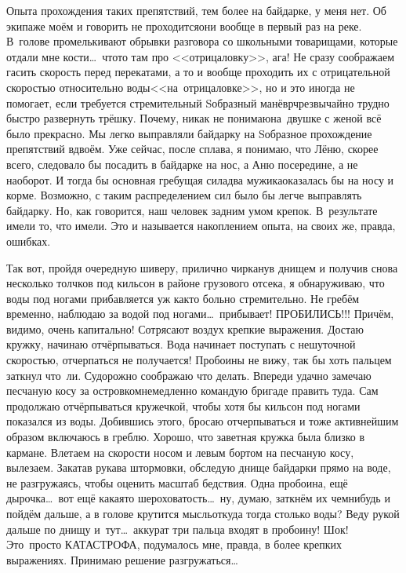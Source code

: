 Опыта прохождения таких препятствий, тем более на байдарке, у меня нет. Об экипаже моём и говорить не проходится\mdash они вообще в первый раз на реке. В~голове промелькивают обрывки разговора со школьными товарищами, которые отдали мне кости\ldots~что\sdash то там про <<отрицаловку>>, ага! Не сразу соображаем гасить скорость перед перекатами, а то и вообще проходить их с отрицательной скоростью относительно воды\mdash <<на~отрицаловке>>, но и это иногда не помогает, если требуется стремительный S\sdash образный манёвр\mdash чрезвычайно трудно быстро развернуть трёшку. Почему, никак не понимаю\mdash на~двушке с женой всё было прекрасно. Мы легко выправляли байдарку на S\sdash образное прохождение препятствий вдвоём. Уже сейчас, после сплава, я понимаю, что Лёню, скорее всего, следовало бы посадить в байдарке на нос, а Аню посередине, а не наоборот. И тогда бы основная гребущая сила\mdash два мужика\mdash оказалась бы на носу и корме. Возможно, с таким распределением сил было бы легче выправлять байдарку. Но, как говорится, наш человек задним умом крепок. В~результате имели то, что имели. Это и называется накоплением опыта, на своих же, правда, ошибках.

Так вот, пройдя очередную шиверу, прилично чирканув днищем и получив снова несколько толчков под кильсон в районе грузового отсека, я обнаруживаю, что воды под ногами прибавляется уж как\sdash то больно стремительно. Не гребём временно, наблюдаю за водой под ногами\ldots~прибывает! ПРОБИЛИСЬ!!! Причём, видимо, очень капитально! Сотрясают воздух крепкие выражения. Достаю кружку, начинаю отчёрпываться. Вода начинает поступать с нешуточной скоростью, отчерпаться не получается! Пробоины не вижу, так бы хоть пальцем заткнул что~ли. Судорожно соображаю что делать. Впереди удачно замечаю песчаную косу за островком\mdash немедленно командую бригаде править туда. Сам продолжаю отчёрпываться кружечкой, чтобы хотя бы кильсон под ногами показался из воды. Добившись этого, бросаю отчерпываться и тоже активнейшим образом включаюсь в греблю. Хорошо, что заветная кружка была близко в кармане.
\newpage
Влетаем на скорости носом и левым бортом на песчаную косу, вылезаем. Закатав рукава штормовки, обследую днище байдарки прямо на воде, не разгружаясь, чтобы оценить масштаб бедствия. Одна пробоина, ещё дырочка\ldots~вот ещё какая\sdash то шероховатость\ldots~ну, думаю, заткнём их чем\sdash нибудь и пойдём дальше, а в голове крутится мысль\mdash откуда тогда столько воды? Веду рукой дальше по днищу и~тут\ldots~аккурат три пальца входят в пробоину! Шок! Это~просто КАТАСТРОФА, подумалось мне, правда, в более крепких выражениях. Принимаю решение разгружаться\ldots~

